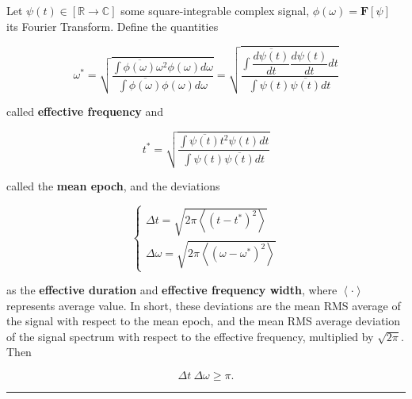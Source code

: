 \begin{theorem}\label{theo:principle_comm} %

	Let $\psi(t)\in\left[\mathbb{R}\to\mathbb{C}\right]$ some square-integrable complex signal, $\phi(\omega) = \mathbf{F}\left[\psi\right]$ its Fourier Transform. Define the quantities

\begin{equation} \omega^* = \sqrt{ \dfrac{\displaystyle\int \overline{\phi(\omega)} \omega^2 \phi(\omega) d\omega}{\displaystyle\int\overline{\phi(\omega)}\phi(\omega) d\omega }} = \sqrt{\dfrac{\displaystyle\int \overline{\dfrac{d\psi(t)}{dt}} \dfrac{d\psi(t)}{dt} dt}{\displaystyle\int \psi(t)\overline{\psi(t)}dt} } \end{equation}

	\noindent called \textbf{effective frequency} and

\begin{equation} t^* = \sqrt{\dfrac{\displaystyle\int \overline{\psi(t)}t^2\psi(t) dt}{\displaystyle\int \psi(t)\overline{\psi(t)}dt}} \end{equation}

	\noindent called the \textbf{mean epoch}, and the deviations

\begin{equation} \left\{\begin{array}{l} \Delta t = \sqrt{2\pi\left\langle\left(t - t^*\right)^2\right\rangle} \\[3mm] \Delta \omega = \sqrt{2\pi\left\langle\left(\omega - \omega^*\right)^2\right\rangle}\end{array}\right.  \end{equation}

	\noindent as the \textbf{effective duration} and \textbf{effective frequency width}, where $\left\langle\cdot\right\rangle$ represents average value. In short, these deviations are the mean RMS average of the signal with respect to the mean epoch, and the mean RMS average deviation of the signal spectrum with respect to the effective frequency, multiplied by $\sqrt{2\pi}$. Then

\begin{equation} \Delta t\ \Delta \omega \geq \pi . \label{eq:gabor_inequality}\end{equation}

\hrule
\end{theorem}
\vspace{5mm}

